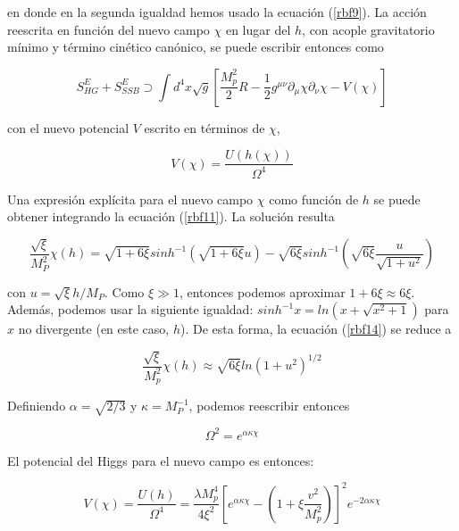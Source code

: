 en donde en la segunda igualdad hemos usado la ecuación (\ref{rbf9}). La acción reescrita en función del nuevo campo $\chi$ en lugar del $h$, con acople gravitatorio mínimo y término cinético canónico, se puede escribir entonces como

\begin{equation}
S_{HG}^{E}+S^{E}_{SSB} \supset \int d^{4}x \sqrt{g} \left[ \frac{M_{p}^{2}}{2} R-\frac{1}{2} g^{\mu \nu} \partial_{\mu} \chi \partial_{\nu} \chi -V(\chi)\right]
\label{rbf12}
\end{equation}

con el nuevo potencial $V$ escrito en términos de $\chi$,


\begin{equation}
V(\chi)=\frac{U(h(\chi))}{\Omega ^{4}}
\label{rbf13}
\end{equation}

Una expresión explícita para el nuevo campo $\chi$ como función de $h$ se puede obtener integrando la ecuación (\ref{rbf11}). La solución resulta


\begin{equation}
\frac{\sqrt{\xi}}{M_{P}^{2}}\chi (h)=\sqrt{1+6\xi} sinh ^{-1} (\sqrt{1+6\xi}u)-\sqrt{6\xi} sinh ^{-1} \left( \sqrt{6\xi} \frac{u}{\sqrt{1+u^{2}}} \right)
\label{rbf14}
\end{equation}


con $u=\sqrt{\xi}h/M_{P}$. Como $\xi \gg 1$, entonces podemos aproximar $1+6\xi \approx 6\xi$. Además, podemos usar la siguiente igualdad: $sinh^{-1}x= ln(x+\sqrt{x^{2}+1})$ para $x$ no divergente (en este caso, $h$). De esta forma, la ecuación (\ref{rbf14}) se reduce a


\begin{equation}
\frac{\sqrt{\xi}}{M_{p}^{2}} \chi (h) \approx \sqrt{6 \xi} ln(1+u^{2})^{1/2}
\label{rbf15}
\end{equation}


Definiendo $\alpha=\sqrt{2/3}$ y $\kappa=M_{P}^{-1}$, podemos reescribir entonces


\begin{equation}
\Omega ^{2}=e^{\alpha \kappa \chi}
\label{rbf16}
\end{equation}


El potencial del Higgs para el nuevo campo es entonces:


\begin{equation}
V(\chi)=\frac{U(h)}{\Omega^4}=\frac{\lambda M_{p}^{4}}{4 \xi^{2}} \left[ e^{\alpha \kappa \chi}-\left( 1+\xi \frac{v^{2}}{M_{p}^{2}} \right) \right]^{2} e^{-2 \alpha \kappa \chi}
\label{rbf17}
\end{equation}


